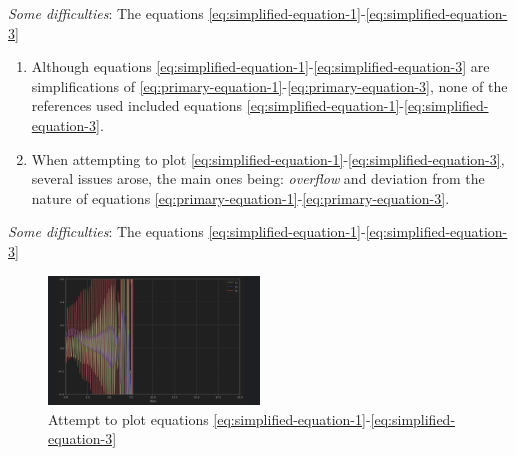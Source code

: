 
\begin{frame}{\textit{Some difficulties}: The equations \eqref{eq:simplified-equation-1}-\eqref{eq:simplified-equation-3}}
		
	\begin{enumerate}
		\item Although equations \eqref{eq:simplified-equation-1}-\eqref{eq:simplified-equation-3} are simplifications of \eqref{eq:primary-equation-1}-\eqref{eq:primary-equation-3}, none of the references used included equations \eqref{eq:simplified-equation-1}-\eqref{eq:simplified-equation-3}.
		\item When attempting to plot \eqref{eq:simplified-equation-1}-\eqref{eq:simplified-equation-3}, several issues arose, the main ones being: \textit{overflow} and deviation from the nature of equations \eqref{eq:primary-equation-1}-\eqref{eq:primary-equation-3}.
	\end{enumerate}
\end{frame}


\begin{frame}{\textit{Some difficulties}: The equations \eqref{eq:simplified-equation-1}-\eqref{eq:simplified-equation-3}}
	\begin{figure}
		\centering
		\includegraphics[width=0.5\textwidth]{img/erro_simplificado.jpeg}
		\caption{Attempt to plot equations \eqref{eq:simplified-equation-1}-\eqref{eq:simplified-equation-3}}
		\label{fig:erro-plotagem-eq-simp}
	\end{figure}
\end{frame}


